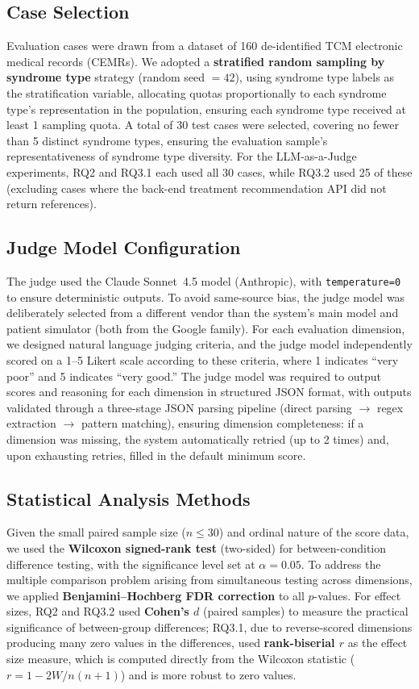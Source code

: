 \documentclass[12pt]{article}
\begin{document}
\subsection{Case Selection}

Evaluation cases were drawn from a dataset of 160 de-identified TCM electronic medical records (CEMRs).
We adopted a \textbf{stratified random sampling by syndrome type} strategy (random seed $= 42$), using syndrome type labels as the stratification variable,
allocating quotas proportionally to each syndrome type's representation in the population, ensuring each syndrome type received at least 1 sampling quota.
A total of 30 test cases were selected, covering no fewer than 5 distinct syndrome types, ensuring the evaluation sample's representativeness of syndrome type diversity.
For the LLM-as-a-Judge experiments, RQ2 and RQ3.1 each used all 30 cases, while RQ3.2 used 25 of these (excluding cases where the back-end treatment recommendation API did not return references).

\subsection{Judge Model Configuration}

The judge used the Claude Sonnet~4.5 model (Anthropic), with \texttt{temperature=0} to ensure deterministic outputs. To avoid same-source bias, the judge model was deliberately selected from a different vendor than the system's main model and patient simulator (both from the Google family).
For each evaluation dimension, we designed natural language judging criteria,
and the judge model independently scored on a 1--5 Likert scale according to these criteria, where 1 indicates ``very poor'' and 5 indicates ``very good.''
The judge model was required to output scores and reasoning for each dimension in structured JSON format,
with outputs validated through a three-stage JSON parsing pipeline (direct parsing $\rightarrow$ regex extraction $\rightarrow$ pattern matching),
ensuring dimension completeness: if a dimension was missing, the system automatically retried (up to 2 times) and, upon exhausting retries, filled in the default minimum score.

\subsection{Statistical Analysis Methods}

Given the small paired sample size ($n \leq 30$) and ordinal nature of the score data,
we used the \textbf{Wilcoxon signed-rank test} (two-sided) for between-condition difference testing,
with the significance level set at $\alpha = 0.05$.
To address the multiple comparison problem arising from simultaneous testing across dimensions,
we applied \textbf{Benjamini--Hochberg FDR correction} to all $p$-values.
For effect sizes, RQ2 and RQ3.2 used \textbf{Cohen's $d$} (paired samples) to measure the practical significance of between-group differences;
RQ3.1, due to reverse-scored dimensions producing many zero values in the differences,
used \textbf{rank-biserial $r$} as the effect size measure,
which is computed directly from the Wilcoxon statistic ($r = 1 - 2W / n(n+1)$) and is more robust to zero values.
\end{document}
